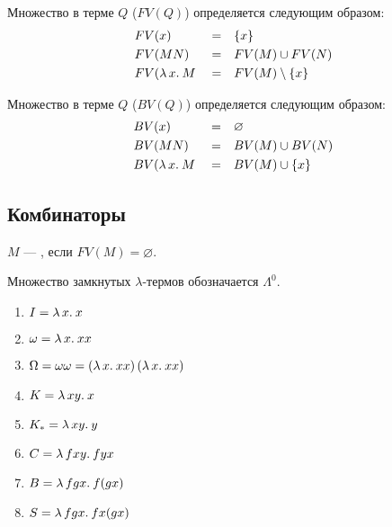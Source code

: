 \documentclass[11pt,a4paper]{article}
\begin{document}
\begin{defn}
	Множество  в терме $ Q$ ($ FV(Q)$) определяется следующим образом:
	\[
	\begin{aligned}
		& FV(x) && = && \{x\} \\
		& FV(MN) && = && FV(M) \cup FV(N) \\
		& FV(\lambda\,{x}.\:{M} && = && FV(M) \setminus \{x\}
	\end{aligned}
	\]
\end{defn}

\begin{defn}
	Множество  в терме $ Q$ ($ BV(Q)$) определяется следующим образом:
	\[
	\begin{aligned}
		& BV(x) && = && \varnothing \\
		& BV(MN) && = && BV(M) \cup BV(N) \\
		& BV(\lambda\,{x}.\:{M} && = && BV(M) \cup  \{x\}
	\end{aligned}
	\]
\end{defn}

\subsection{Комбинаторы}
\begin{defn}[Комбинатор]
$ M$ --- , если $ FV(M) = \varnothing$. 

\noindent
Множество замкнутых $ \lambda$-термов обозначается $ \Lambda^{0}$.
\end{defn}
\begin{enumerate}[noitemsep]
	\item $ I = \lambda\,{x}.\:{x}$
	\item $ \omega = \lambda\,{x}.\:{x x}$
	\item $ \Omega = \omega \omega = \left( \lambda\,{x}.\:{x x} \right) \left( \lambda\,{x}.\:{x x} \right) $
	\item $ K = \lambda\,{x y}.\:{x}$
	\item  $ K_{*} = \lambda\,{x y}.\:{y}$
	\item $ C = \lambda\,{f x y}.\:{f y x}$ 
	\item $ B = \lambda\,{f g x}.\:{f (g x)}$
	\item $ S = \lambda\,{f g x}.\:{f x (g x)}$
\end{enumerate} 
\end{document}
